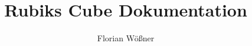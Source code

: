 \documentclass[envcountsame, envcountchap, deutsch]{i-studis}
\begin{document}
\title{Rubiks Cube Dokumentation}

\author{Florian Wößner}


\address{Trier}


\mytitlepage

\frontmatter
\tableofcontents										%


\mainmatter




\backmatter


\begin{appendix}
\end{appendix}
\end{document}
